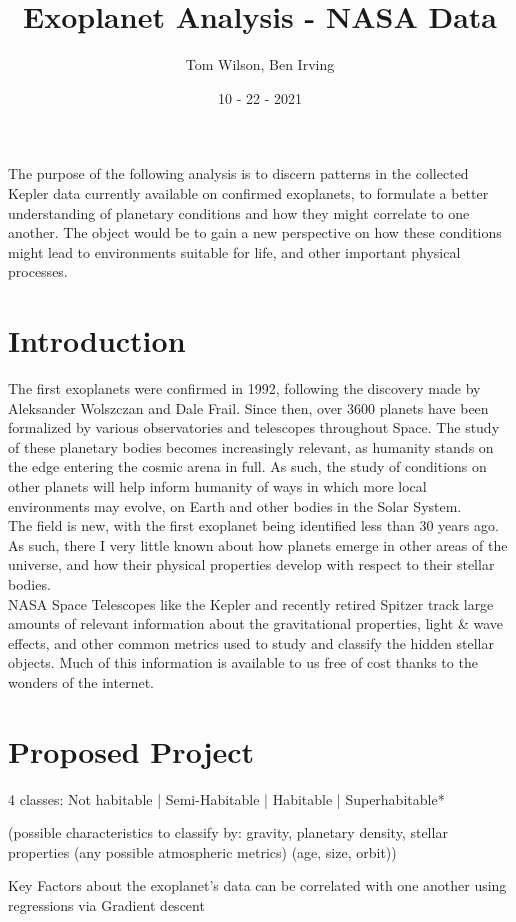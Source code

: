 \documentclass[12pt]{article}
\title{Exoplanet Analysis - NASA Data}
\author{Tom Wilson, Ben Irving}
\date{10 - 22 - 2021}
\begin{document}
\maketitle

\abstract
The purpose of the following analysis is to discern patterns in the collected Kepler data currently available on confirmed exoplanets, to formulate a better understanding of planetary conditions and how they might correlate to one another. The object would be to gain a new perspective on how these conditions might lead to environments suitable for life, and other important physical processes. 
\section{Introduction}
The first exoplanets were confirmed in 1992, following the discovery made by Aleksander Wolszczan and Dale Frail. Since then, over 3600 planets have been formalized by various observatories and telescopes throughout Space. The study of these planetary bodies becomes increasingly relevant, as humanity stands on the edge entering the cosmic arena in full. As such, the study of conditions on other planets will help inform humanity of ways in which more local environments may evolve, on Earth and other bodies in the Solar System. 
\\
The field is new, with the first exoplanet being identified less than 30 years ago. As such, there I very little known about how planets emerge in other areas of the universe, and how their physical properties develop with respect to their stellar bodies. \\
NASA Space Telescopes like the Kepler and recently retired Spitzer track large amounts of relevant information about the gravitational properties, light \& wave effects, and other common metrics used to study and classify the hidden stellar objects. Much of this information is available to us free of cost thanks to the wonders of the internet.
\section{Proposed Project}
4 classes: 
Not habitable | Semi-Habitable | Habitable | Superhabitable*

(possible characteristics to classify by: gravity, planetary density, stellar properties 
(any possible atmospheric metrics)
(age, size, orbit))

Key Factors about the exoplanet's data can be correlated with one another using regressions via Gradient descent
\end{document}
